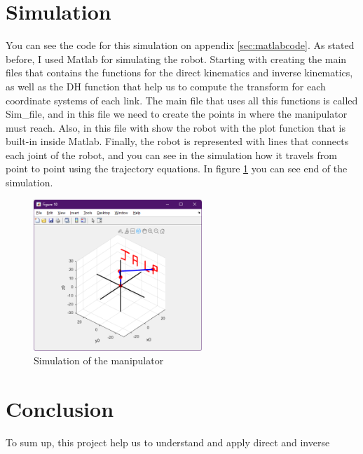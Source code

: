 \documentclass[12pt]{article}
\begin{document}
    \section{Simulation}
    You can see the code for this simulation on appendix \ref{sec:matlabcode}.
    As stated before, I used Matlab for simulating the robot. Starting with creating the main files that contains the functions for 
    the direct kinematics and inverse kinematics, as well as the DH function that help us to compute the transform for each coordinate systems of each link.
    The main file that uses all this functions is called Sim\_file, and in this file we need to create the points in where the manipulator must reach.
    Also, in this file with show the robot with the plot function that is built-in inside Matlab.
    Finally, the robot is represented with lines that connects each joint of the robot, and you can see in the simulation how it travels from point to point
    using the trajectory equations. In figure \ref{fig:sim} you can see end of the simulation.
    \begin{figure}[h]
        \centering
        \includegraphics[width = 2.5in]{sim.png}
        \caption{Simulation of the manipulator}
        \label{fig:sim}
    \end{figure}

    \section{Conclusion}
    To sum up, this project help us to understand and apply direct and inverse 

    \pagebreak
    \printbibliography

    \pagebreak
    \appendix
\end{document}
